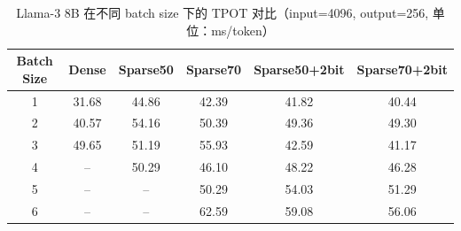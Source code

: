 \begin{table}[t]
\centering
\caption{Llama-3 8B 在不同 batch size 下的 TPOT 对比（input=4096, output=256, 单位：ms/token）}
\label{tab:end2end-tpot-bs}
\begin{tabular}{cccccc}
\toprule
Batch Size & Dense & Sparse50 & Sparse70 & Sparse50+2bit & Sparse70+2bit \\
\midrule
1 & 31.68 & 44.86 & 42.39 & 41.82 & 40.44 \\
2 & 40.57 & 54.16 & 50.39 & 49.36 & 49.30 \\
3 & 49.65 & 51.19 & 55.93 & 42.59 & 41.17 \\
4 & -- & 50.29 & 46.10 & 48.22 & 46.28 \\
5 & -- & -- & 50.29 & 54.03 & 51.29 \\
6 & -- & -- & 62.59 & 59.08 & 56.06 \\
\bottomrule
\end{tabular}
\end{table}
